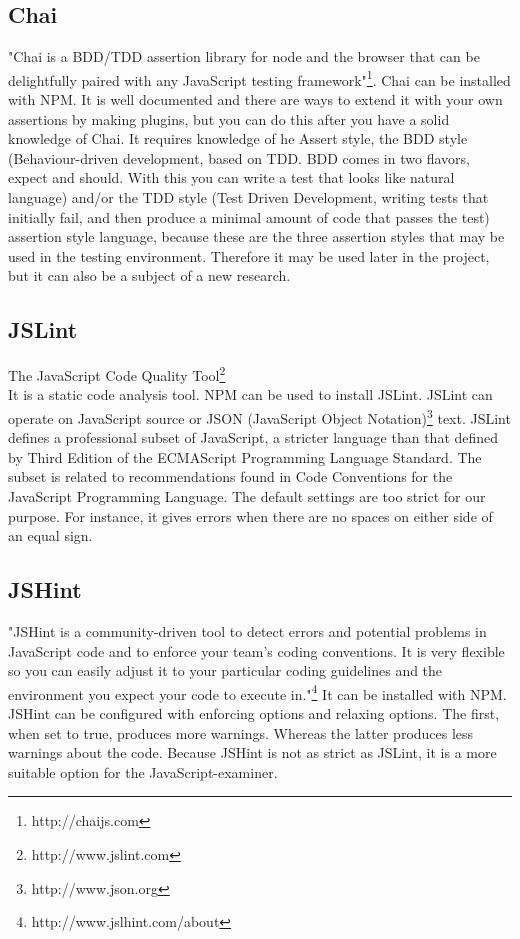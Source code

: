 \documentclass{article}
\begin{document}
\subsection{Chai}
"Chai is a BDD/TDD assertion library for node and the browser that can be delightfully paired with any JavaScript testing framework"\footnote{http://chaijs.com}.
Chai can be installed with NPM.
It is well documented and there are ways to extend it with your own assertions by making plugins,
but you can do this after you have a solid knowledge of Chai.
It requires knowledge of he Assert style, the BDD style (Behaviour-driven development, based on TDD. BDD comes in two flavors, expect and should. With this you can write a test that looks like natural language) and/or the TDD style (Test Driven Development, writing tests that initially fail, and then produce a minimal amount of code that passes the test) assertion style language, because these are the three assertion styles that may be used in the testing environment.
Therefore it may be used later in the project, but it can also be a subject of a new research.

\subsection{JSLint}
The JavaScript Code Quality Tool\footnote{http://www.jslint.com}\\
It is a static code analysis tool.
NPM can be used to install JSLint.
JSLint can operate on JavaScript source or JSON (JavaScript Object Notation)\footnote {http://www.json.org} text.
JSLint defines a professional subset of JavaScript, a stricter language than that 
defined by Third Edition of the ECMAScript Programming Language Standard.
The subset is related to recommendations found in Code Conventions for the JavaScript Programming Language.
The default settings are too strict for our purpose.
For instance, it gives errors when there are no spaces on either side of an equal sign.

\subsection{JSHint}
"JSHint is a community-driven tool to detect errors and potential problems in JavaScript code and to enforce your team's coding conventions. It is very flexible so you can easily adjust it to your particular coding guidelines and the environment you expect your code to execute in."\footnote{http://www.jslhint.com/about}
It can be installed with NPM.
JSHint can be configured with enforcing options and relaxing options.
The first, when set to true, produces more warnings. Whereas the latter produces less warnings about the code.
Because JSHint is not as strict as JSLint, it is a more suitable option for the JavaScript-examiner.
\end{document}
